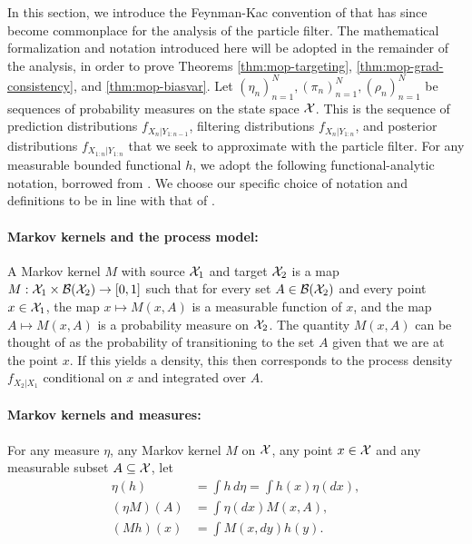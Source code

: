 

In this section, we introduce the Feynman-Kac convention of \cite{delMoral04} that has since become commonplace \citep{karjalainen23} for the analysis of the particle filter. The mathematical formalization and notation introduced here will be adopted in the remainder of the analysis, in order to prove Theorems \ref{thm:mop-targeting}, \ref{thm:mop-grad-consistency}, and \ref{thm:mop-biasvar}. Let $(\eta_n)_{n=1}^N, (\pi_n)_{n=1}^N, (\rho_n)_{n=1}^N$ be sequences of probability measures on the state space ${\mathcal{X}}$. This is the sequence of prediction distributions $f_{X_{n}|Y_{1:n-1}}$, filtering distributions $f_{X_{n}|Y_{1:n}}$, and posterior distributions $f_{X_{1:n}|Y_{1:n}}$ that we seek to approximate with the particle filter. For any measurable bounded functional $h$, we adopt the following functional-analytic notation, borrowed from \cite{delMoral04, chopin20, karjalainen23}. We choose our specific choice of notation and definitions to be in line with that of \cite{karjalainen23}. 


\paragraph{\bf Markov kernels and the process model:} A Markov kernel $M$ with source ${\mathcal{X}}_1$ and target ${\mathcal{X}}_2$ is a map $M: {\mathcal{X}}_1 \times \mathcal{B}({\mathcal{X}}_2) \to [0,1]$ such that for every set $A \in \mathcal{B}({\mathcal{X}}_2)$ and every point $x \in {\mathcal{X}}_1$, the map $x \mapsto M(x, A)$ is a measurable function of $x$, and the map $A \mapsto M(x,A)$ is a probability measure on ${\mathcal{X}}_2$. The quantity $M(x,A)$ can be thought of as the probability of transitioning to the set $A$ given that we are at the point $x$. If this yields a density, this then corresponds to the process density $f_{X_{2}|X_1}$ conditional on $x$ and integrated over $A$.  

\paragraph{\bf Markov kernels and measures:} For any measure $\eta$, any Markov kernel $M$ on ${\mathcal{X}}$, any point $x \in {\mathcal{X}}$ and any measurable subset $A \subseteq {\mathcal{X}}$, let 
\begin{align}
    \eta(h) &= \int h \, d\eta = \int h(x) \eta(dx), \\(\eta M)(A) &= \int \eta(dx)M(x,A), \\
    (Mh)(x) &= \int M(x, dy) h(y).
\end{align}

